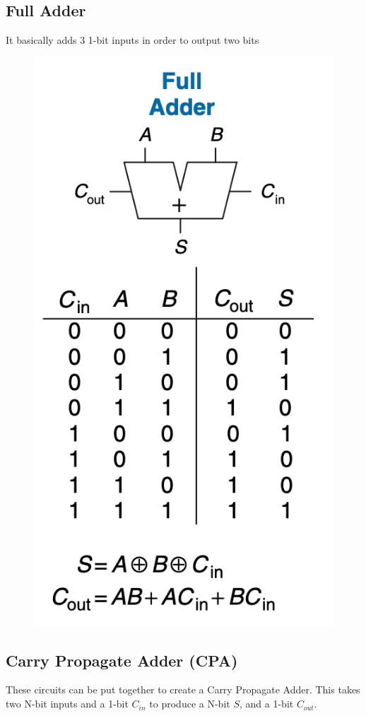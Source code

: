 \documentclass[12pt]{report}
\begin{document}
\subsection{Full Adder}
It basically adds 3 1-bit inputs in order to output two bits \medskip
\begin{figure}[h!]
  \centering
  \includegraphics[width=.5\textwidth]{full-adder.png}
\end{figure}
\pagebreak
\subsection{Carry Propagate Adder (CPA)}
These circuits can be put together to create a Carry Propagate Adder. This takes two N-bit inputs
and a 1-bit $C_{in}$ to produce a N-bit $S$, and a 1-bit $C_{out}$.
\end{document}

